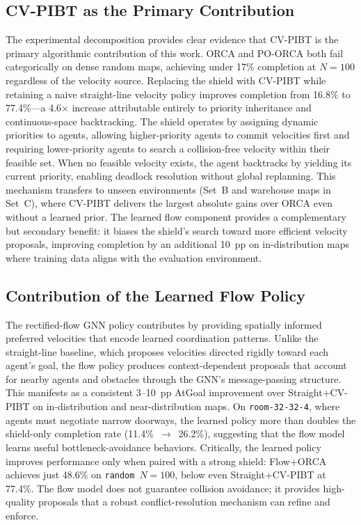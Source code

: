 \subsection{CV-PIBT as the Primary Contribution}\label{sec:shield-contrib}

The experimental decomposition provides clear evidence that
CV-PIBT is the primary algorithmic contribution of this work.
ORCA and PO-ORCA both fail categorically on dense random maps,
achieving under 17\% completion at $N\!=\!100$ regardless of the
velocity source.
Replacing the shield with CV-PIBT while retaining a naive
straight-line velocity policy improves completion from 16.8\%
to 77.4\%---a 4.6$\times$ increase attributable entirely to
priority inheritance and continuous-space backtracking.
The shield operates by assigning dynamic priorities to agents,
allowing higher-priority agents to commit velocities first and
requiring lower-priority agents to search a collision-free velocity
within their feasible set.
When no feasible velocity exists, the agent backtracks by yielding
its current priority, enabling deadlock resolution without global
replanning.
This mechanism transfers to unseen environments
(Set~B and warehouse maps in Set~C), where CV-PIBT delivers
the largest absolute gains over ORCA even without a learned prior.
The learned flow component provides a complementary but secondary
benefit: it biases the shield's search toward more efficient
velocity proposals, improving completion by an additional 10~pp
on in-distribution maps where training data aligns with the
evaluation environment.

\subsection{Contribution of the Learned Flow Policy}\label{sec:flow-contrib}

The rectified-flow GNN policy contributes by providing
spatially informed preferred velocities that encode learned
coordination patterns.
Unlike the straight-line baseline, which proposes velocities
directed rigidly toward each agent's goal, the flow policy
produces context-dependent proposals that account for nearby
agents and obstacles through the GNN's message-passing structure.
This manifests as a consistent 3--10~pp AtGoal improvement
over Straight+CV-PIBT on in-distribution and
near-distribution maps.
On \texttt{room-32-32-4}, where agents must negotiate narrow
doorways, the learned policy more than doubles the shield-only
completion rate (11.4\%~$\to$~26.2\%), suggesting that
the flow model learns useful bottleneck-avoidance behaviors.
Critically, the learned policy improves performance only when
paired with a strong shield: Flow+ORCA achieves just 48.6\%
on \texttt{random}~$N\!=\!100$, below even
Straight+CV-PIBT at 77.4\%.
The flow model does not guarantee collision avoidance; it
provides high-quality proposals that a robust conflict-resolution
mechanism can refine and enforce.

